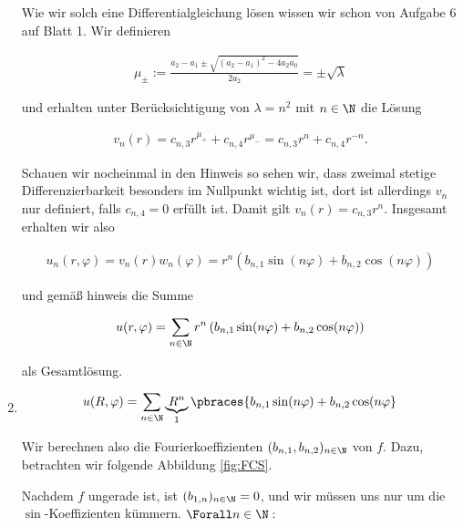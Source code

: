 \begin{solution}
\begin{enumerate}[label = (\roman*)]
    Wie wir solch eine Differentialgleichung lösen wissen wir schon von Aufgabe 6 auf Blatt 1. Wir definieren 

    \begin{align*}
        \mu_\pm := \frac{a_2 - a_1 \pm \sqrt{(a_2 - a_1)^2 - 4a_2a_0}}{2a_2} = \pm \sqrt{\lambda}  
    \end{align*}

    und erhalten unter Berücksichtigung von $\lambda = n^2$ mit $n \in \N$ die Lösung

    \begin{align*}
        v_n(r) = c_{n,3} r^{\mu_+} + c_{n,4} r^{\mu_-} = c_{n,3} r^{n} + c_{n,4} r^{-n}.
    \end{align*}

    Schauen wir nocheinmal in den Hinweis so sehen wir, dass zweimal stetige Differenzierbarkeit besonders im Nullpunkt wichtig ist, dort ist allerdings $v_n$ nur definiert, falls $c_{n,4} = 0$ erfüllt ist. Damit gilt $v_n(r) = c_{n,3} r^{n}$.
    Insgesamt erhalten wir also 

    \begin{align*}
        u_n(r,\varphi) = v_n(r) w_n(\varphi) = r^n \left(b_{n,1} \sin(n\varphi) + b_{n,2} \cos(n\varphi)\right)
    \end{align*}

    und gemäß hinweis die Summe

    \begin{align*}
        u(r, \varphi) = \sum_{n \in \N} r^n \left(b_{n,1} \sin(n\varphi) + b_{n,2} \cos(n\varphi)\right)
    \end{align*}
    
    als Gesamtlösung.

    \item 
    
    \begin{align*}
        u(R, \varphi)
        =
        \sum_{n \in \N}
        \underbrace{R^n}_1
        \pbraces
        {
            b_{n, 1} \sin(n\varphi)
            +
            b_{n, 2} \cos(n\varphi
        }
    \end{align*}

    Wir berechnen also die Fourierkoeffizienten $(b_{n, 1}, b_{n, 2})_{n \in \N}$ von $f$.
    Dazu, betrachten wir folgende Abbildung \ref{fig:FCS}.


    Nachdem $f$ ungerade ist, ist $(b_{1, n})_{n \in \N} = 0$, und wir müssen uns nur um die $\sin$-Koeffizienten kümmern.
    $\Forall n \in \N:$


\end{enumerate}
\end{solution}
